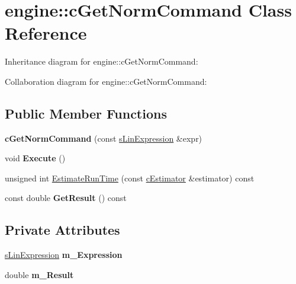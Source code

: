 \hypertarget{classengine_1_1cGetNormCommand}{\section{engine\-:\-:c\-Get\-Norm\-Command Class Reference}
\label{classengine_1_1cGetNormCommand}
}


Inheritance diagram for engine\-:\-:c\-Get\-Norm\-Command\-:


Collaboration diagram for engine\-:\-:c\-Get\-Norm\-Command\-:
\subsection*{Public Member Functions}
\begin{DoxyCompactItemize}
\item 
\hypertarget{classengine_1_1cGetNormCommand_a353d6cf6d2dec48ddca87c2c4217d798}{{\bfseries c\-Get\-Norm\-Command} (const \hyperlink{structengine_1_1sLinExpression}{s\-Lin\-Expression} \&expr)}\label{classengine_1_1cGetNormCommand_a353d6cf6d2dec48ddca87c2c4217d798}

\item 
\hypertarget{classengine_1_1cGetNormCommand_a7542f372a05f7d1a3caee3c6249082ef}{void {\bfseries Execute} ()}\label{classengine_1_1cGetNormCommand_a7542f372a05f7d1a3caee3c6249082ef}

\item 
unsigned int \hyperlink{classengine_1_1cGetNormCommand_afee08e7e84b009b5f3d41b9888f80f2c}{Estimate\-Run\-Time} (const \hyperlink{classengine_1_1cEstimator}{c\-Estimator} \&estimator) const 
\item 
\hypertarget{classengine_1_1cGetNormCommand_a40b90d205cd1f843f73a939626667e73}{const double {\bfseries Get\-Result} () const }\label{classengine_1_1cGetNormCommand_a40b90d205cd1f843f73a939626667e73}

\end{DoxyCompactItemize}
\subsection*{Private Attributes}
\begin{DoxyCompactItemize}
\item 
\hypertarget{classengine_1_1cGetNormCommand_ad1cad4a8ee61235d4846f1c1edb2318c}{\hyperlink{structengine_1_1sLinExpression}{s\-Lin\-Expression} {\bfseries m\-\_\-\-Expression}}\label{classengine_1_1cGetNormCommand_ad1cad4a8ee61235d4846f1c1edb2318c}

\item 
\hypertarget{classengine_1_1cGetNormCommand_a0ff6140614a4dca24552fe45104ac17f}{double {\bfseries m\-\_\-\-Result}}\label{classengine_1_1cGetNormCommand_a0ff6140614a4dca24552fe45104ac17f}

\end{DoxyCompactItemize}


